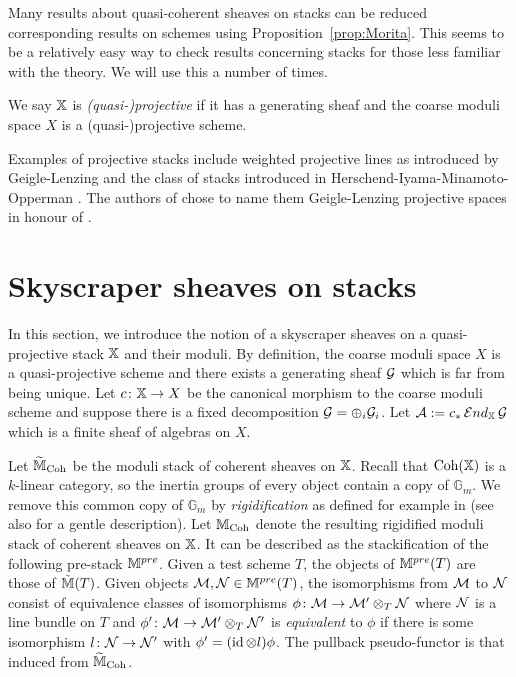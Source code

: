 \documentclass[12pt]{amsart}
\begin{document}
\begin{remark}  \label{rem:Morita}
Many results about quasi-coherent sheaves on stacks can be reduced corresponding results on schemes using Proposition~\ref{prop:Morita}. This seems to be a relatively easy way to check results concerning stacks for those less familiar with the theory. We will use this a number of times.
\end{remark}

\begin{definition}
We say $\mathbb{X}$ is {\em (quasi-)projective} if it has a generating sheaf and the coarse moduli space $X$ is a (quasi-)projective scheme.
\end{definition}

Examples of projective stacks include weighted projective lines as introduced by Geigle-Lenzing \cite{GL} and the class of stacks introduced in Herschend-Iyama-Minamoto-Opperman \cite{HIMO}.
The authors of \cite{HIMO} chose to name them Geigle-Lenzing projective spaces in honour of \cite{GL}.

\section{Skyscraper sheaves on stacks}
\label{sec:sky}

In this section, we introduce the notion of a skyscraper sheaves on a quasi-projective stack $\mathbb{X}$ and their moduli. By definition, the coarse moduli space $X$ is a quasi-projective scheme and there exists a generating sheaf $\mathcal{G}$ which is far from being unique. Let $c \colon \mathbb{X} \rightarrow X$ be the canonical morphism to the coarse moduli scheme and suppose there is a fixed decomposition $\mathcal{G} = \oplus_i \mathcal{G}_i$. Let $\mathcal{A} := c_* \mathop{{\mathcal{E}}nd}\nolimits_{\mathbb{X}} \mathcal{G}$ which is a finite sheaf of algebras on $X$.

Let $\widetilde{\mathbb{M}}_{\operatorname{Coh}}$ be the moduli stack of coherent sheaves on $\mathbb{X}$. Recall that $\operatorname{Coh}(\mathbb{X})$ is a $k$-linear category, so the inertia groups of every object contain a copy of $\mathbb{G}_m$. We remove this common copy of $\mathbb{G}_m$ by {\em rigidification} as defined for example in \cite[Section~5]{ACV} (see also \cite[Section~2.3]{CL} for a gentle description). Let $\mathbb{M}_{\operatorname{Coh}}$ denote the resulting rigidified moduli stack of coherent sheaves on $\mathbb{X}$. It can be described as the stackification of the following pre-stack $\mathbb{M}^{pre}$. Given a test scheme $T$, the objects of $\mathbb{M}^{pre}(T)$ are those of $\tilde{\mathbb{M}}(T)$. Given objects $\mathcal{M}, \mathcal{N} \in \mathbb{M}^{pre}(T)$, the isomorphisms from $\mathcal{M}$ to $\mathcal{N}$ consist of equivalence classes of isomorphisms $\phi \colon \mathcal{M} \to \mathcal{M}' \otimes_T \mathcal{N}$ where $\mathcal{N}$ is a line bundle on $T$ and $\phi' \colon \mathcal{M} \to \mathcal{M}' \otimes_T \mathcal{N}'$ is {\em equivalent} to $\phi$ if there is some isomorphism $l \colon \mathcal{N} \to \mathcal{N}'$ with $\phi' = (\operatorname{id} \otimes l) \phi$. The pullback pseudo-functor is that induced from $\widetilde{\mathbb{M}}_{\operatorname{Coh}}$. 
\end{document}
